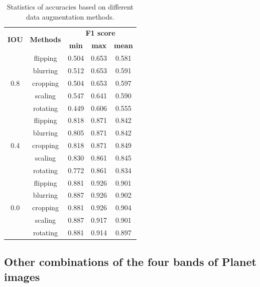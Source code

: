 \documentclass[preprint,12pt,authoryear]{elsarticle}
\begin{document}
\begin{table}[ht]
\centering
\footnotesize
\caption{Statistics of accuracies based on different data augmentation methods.}
\label{table_stastic_imgaug}
\begin{tabular}{c c c c  c  }
\toprule
\multirow{2}{*}{\textbf{IOU}}&\multirow{2}{*}{\textbf{Methods}}& \multicolumn{3}{c}{ \textbf{F1 score}} \\
 & &\textbf{min}&\textbf{max}&\textbf{mean}\\
\midrule
\multirow{5}{*}{0.8} &   flipping & 0.504 & 0.653 & 0.581 \\
  & blurring & 0.512 & 0.653 & 0.591\\
 & cropping & 0.504 & 0.653 & 0.597\\
 & scaling & 0.547 & 0.641 & 0.590\\
& rotating & 0.449 & 0.606 & 0.555 \\

\midrule
\multirow{5}{*}{0.4} &  flipping & 0.818 & 0.871 & 0.842 \\
 &  blurring & 0.805 & 0.871 & 0.842\\
 & cropping & 0.818 & 0.871 & 0.849\\
 & scaling & 0.830 & 0.861 & 0.845\\
& rotating & 0.772 & 0.861 & 0.834\\

\midrule
\multirow{5}{*}{0.0} & flipping & 0.881 & 0.926 & 0.901 \\
  &blurring & 0.887 & 0.926 & 0.902\\
  &cropping & 0.881 & 0.926 & 0.904\\
 &scaling & 0.887 & 0.917 & 0.901\\
&rotating & 0.881 & 0.914 & 0.897\\

\bottomrule
\end{tabular}
\end{table}

\subsection{Other combinations of the four bands of Planet images}
\label{subsec_otherbands}
\end{document}
